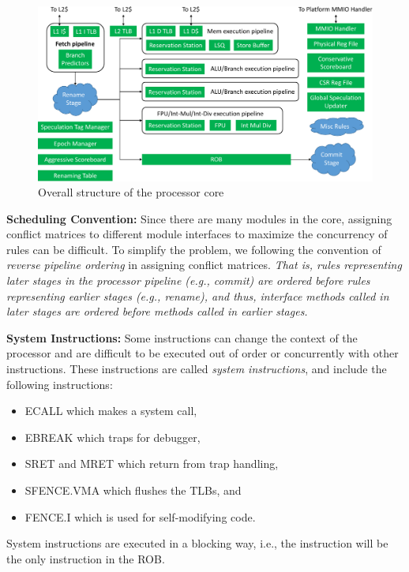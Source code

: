\documentclass[12pt]{article}
\newcommand{\inst}[1]{\textsf{#1}}
\begin{document}
\begin{figure}
    \centering
    \includegraphics[width=\columnwidth]{fig/core_crop.pdf}
    \caption{Overall structure of the processor core}\label{fig:core}
\end{figure}

\noindent\textbf{Scheduling Convention:}
Since there are many modules in the core, assigning conflict matrices to different module interfaces to maximize the concurrency of rules can be difficult.
To simplify the problem, we following the convention of \emph{reverse pipeline ordering} in assigning conflict matrices.
\emph{That is, rules representing later stages in the processor pipeline (e.g., commit) are ordered before rules representing earlier stages (e.g., rename), and thus, interface methods called in later stages are ordered before methods called in earlier stages.}

\noindent\textbf{System Instructions:}
Some instructions can change the context of the processor and are difficult to be executed out of order or concurrently with other instructions.
These instructions are called \emph{system instructions}, and include the following instructions:
\begin{itemize}
    \item \inst{ECALL} which makes a system call,
    \item \inst{EBREAK} which traps for debugger,
    \item \inst{SRET} and \inst{MRET} which return from trap handling,
    \item \inst{SFENCE.VMA} which flushes the TLBs, and
    \item \inst{FENCE.I} which is used for self-modifying code.
\end{itemize}
System instructions are executed in a blocking way, i.e., the instruction will be the only instruction in the ROB.
\end{document}
